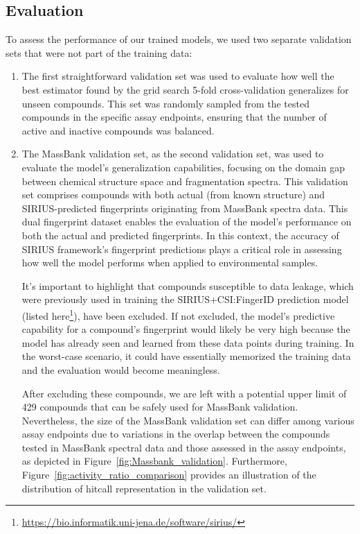 \subsection{Evaluation}
To assess the performance of our trained models, we used two separate validation sets that were not part of the training data:

\begin{enumerate}
    \item The first straightforward validation set was used to evaluate how well the best estimator found by the grid search 5-fold cross-validation generalizes for unseen compounds. This set was randomly sampled from the tested compounds in the specific assay endpoints, ensuring that the number of active and inactive compounds was balanced.
    \item The MassBank validation set, as the second validation set, was used to evaluate the model's generalization capabilities, focusing on the domain gap between chemical structure space and fragmentation spectra. This validation set comprises compounds with both actual (from known structure) and SIRIUS-predicted fingerprints originating from MassBank spectra data. This dual fingerprint dataset enables the evaluation of the model's performance on both the actual and predicted fingerprints. In this context, the accuracy of SIRIUS framework's fingerprint predictions plays a critical role in assessing how well the model performs when applied to environmental samples. 

    It's important to highlight that compounds susceptible to data leakage, which were previously used in training the SIRIUS+CSI:FingerID prediction model (listed here\footnote{\url{https://bio.informatik.uni-jena.de/software/sirius/}}), have been excluded. If not excluded, the model's predictive capability for a compound's fingerprint would likely be very high because the model has already seen and learned from these data points during training. In the worst-case scenario, it could have essentially memorized the training data and the evaluation would become meaningless.

    After excluding these compounds, we are left with a potential upper limit of 429 compounds that can be safely used for MassBank validation. Nevertheless, the size of the MassBank validation set can differ among various assay endpoints due to variations in the overlap between the compounds tested in MassBank spectral data and those assessed in the assay endpoints, as depicted in Figure~\ref{fig:Massbank_validation}. Furthermore, Figure~\ref{fig:activity_ratio_comparison} provides an illustration of the distribution of hitcall representation in the validation set.
    

\end{enumerate}
